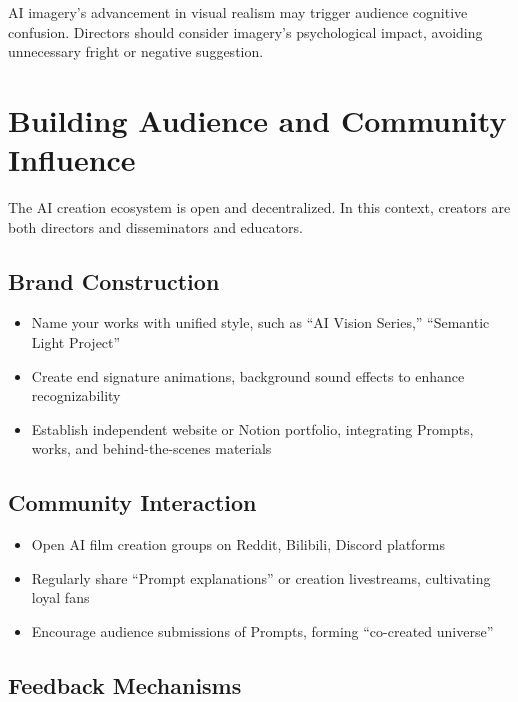 AI imagery's advancement in visual realism may trigger audience cognitive confusion. Directors should consider imagery's psychological impact, avoiding unnecessary fright or negative suggestion.

\section{Building Audience and Community Influence}
\label{sec:audience-building}

The AI creation ecosystem is open and decentralized. In this context, creators are both directors and disseminators and educators.

\subsection{Brand Construction}

\begin{itemize}
\item Name your works with unified style, such as ``AI Vision Series,'' ``Semantic Light Project''
\item Create end signature animations, background sound effects to enhance recognizability
\item Establish independent website or Notion portfolio, integrating Prompts, works, and behind-the-scenes materials
\end{itemize}

\subsection{Community Interaction}

\begin{itemize}
\item Open AI film creation groups on Reddit, Bilibili, Discord platforms
\item Regularly share ``Prompt explanations'' or creation livestreams, cultivating loyal fans
\item Encourage audience submissions of Prompts, forming ``co-created universe''
\end{itemize}

\subsection{Feedback Mechanisms}

